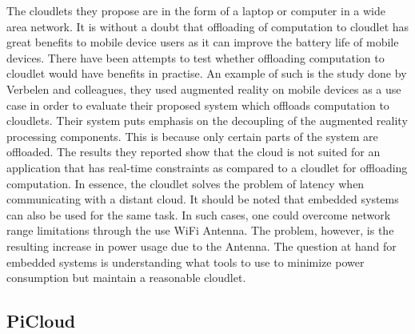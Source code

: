 \noindent The cloudlets they propose are in the form of a laptop or computer in a wide area network. It is without a doubt that offloading of computation to cloudlet has great benefits to mobile device users as it can improve the battery life of mobile devices. There have been attempts to test
whether offloading computation to cloudlet would have benefits in practise. An example of such is the study done by Verbelen and colleagues\cite{RefWorks:93}, they used augmented reality on mobile devices as a use case in order to evaluate their proposed system which offloads computation to cloudlets. Their system puts emphasis on the decoupling of the augmented reality processing components.
This is because only certain parts of the system are offloaded. The results they reported show that the cloud is not suited for an application that has real-time constraints as compared to a cloudlet for offloading computation. In essence, the cloudlet solves the problem of latency when communicating with a distant cloud. It should be noted that embedded systems can also be used for the same task.
In such cases, one could overcome network range limitations through the use WiFi Antenna. The problem, however, is the resulting increase in power usage due to the Antenna. The question at hand for
embedded systems is understanding what tools to use to minimize power consumption but maintain a reasonable cloudlet.\newline

\subsection{PiCloud}

